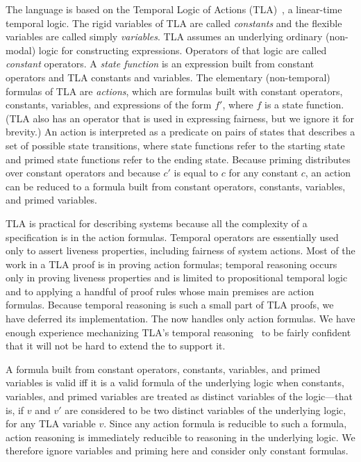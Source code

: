\documentclass[a4paper]{easychair}
\begin{document}
The \tlaplus language is based on the Temporal Logic of Actions
(TLA)~\cite{lamport:newtla}, a linear-time temporal logic. The rigid
variables of TLA are called \emph{constants} and the flexible
variables are called simply \emph{variables}.  TLA assumes an
underlying ordinary (non-modal) logic for constructing expressions.
Operators of that logic are called \emph{constant} operators.  A
\emph{state function} is an expression built from constant operators
and TLA constants and variables.  The elementary (non-temporal)
formulas of TLA are \textit{actions}, which are formulas built with
constant operators, constants, variables, and expressions of the form
$f'$, where $f$ is a state function.  (TLA also has an \ENABLED
operator that is used in expressing fairness, but we ignore it
for brevity.)  An action is interpreted as a predicate on pairs of
states that describes a set of possible state transitions, where state
functions refer to the starting state and primed state functions refer
to the ending state.  Because priming distributes over constant
operators and because $c'$ is equal to $c$ for any constant $c$, an
action can be reduced to a formula built from constant operators,
constants, variables, and primed variables.

TLA is practical for describing systems because all the complexity of
a specification is in the action formulas.  Temporal operators are
essentially used only to assert liveness properties, including
fairness of system actions.  Most of the work in a TLA proof is in
proving action formulas; temporal reasoning occurs only in proving
liveness properties and is limited to propositional temporal logic and
to applying a handful of proof rules whose main premises are action
formulas.  Because temporal reasoning is such a small part of TLA
proofs, we have deferred its implementation.  The \PM now handles
only action formulas.  We have enough experience mechanizing TLA's
temporal reasoning~\cite{engberg:mechanical} to be fairly confident
that it will not be hard to extend the \PM to support it.

A formula built from constant operators, constants, variables, and
primed variables is valid iff it is a valid formula of the underlying
logic when constants, variables, and primed variables are treated as
distinct variables of the logic---that is, if $v$ and $v'$ are
considered to be two distinct variables of the underlying logic, for
any TLA variable $v$.  Since any action formula is reducible to such a
formula, action reasoning is immediately reducible to reasoning in the
underlying logic.  We therefore ignore variables and priming here and
consider only constant formulas.
\end{document}
